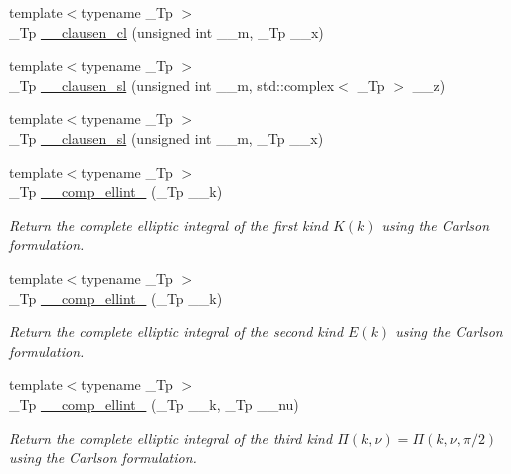 \begin{DoxyCompactItemize}
{\footnotesize template$<$typename \+\_\+\+Tp $>$ }\\\+\_\+\+Tp \hyperlink{namespacestd_1_1____detail_a523b5171a620d8816339c71994e67bb1}{\+\_\+\+\_\+clausen\+\_\+cl} (unsigned int \+\_\+\+\_\+m, \+\_\+\+Tp \+\_\+\+\_\+x)
\item 
{\footnotesize template$<$typename \+\_\+\+Tp $>$ }\\\+\_\+\+Tp \hyperlink{namespacestd_1_1____detail_ab7d250f236ef63ed8bd260881b73524d}{\+\_\+\+\_\+clausen\+\_\+sl} (unsigned int \+\_\+\+\_\+m, std\+::complex$<$ \+\_\+\+Tp $>$ \+\_\+\+\_\+z)
\item 
{\footnotesize template$<$typename \+\_\+\+Tp $>$ }\\\+\_\+\+Tp \hyperlink{namespacestd_1_1____detail_a554bb352d6397ea5991400eb3734165f}{\+\_\+\+\_\+clausen\+\_\+sl} (unsigned int \+\_\+\+\_\+m, \+\_\+\+Tp \+\_\+\+\_\+x)
\item 
{\footnotesize template$<$typename \+\_\+\+Tp $>$ }\\\+\_\+\+Tp \hyperlink{namespacestd_1_1____detail_a7b23bcf7e9f20b1e353a047126e13af1}{\+\_\+\+\_\+comp\+\_\+ellint\+\_} (\+\_\+\+Tp \+\_\+\+\_\+k)
\begin{DoxyCompactList}\small\item\em Return the complete elliptic integral of the first kind $ K(k) $ using the Carlson formulation. \end{DoxyCompactList}\item 
{\footnotesize template$<$typename \+\_\+\+Tp $>$ }\\\+\_\+\+Tp \hyperlink{namespacestd_1_1____detail_a4836f4db24abd037705100750f82d375}{\+\_\+\+\_\+comp\+\_\+ellint\+\_} (\+\_\+\+Tp \+\_\+\+\_\+k)
\begin{DoxyCompactList}\small\item\em Return the complete elliptic integral of the second kind $ E(k) $ using the Carlson formulation. \end{DoxyCompactList}\item 
{\footnotesize template$<$typename \+\_\+\+Tp $>$ }\\\+\_\+\+Tp \hyperlink{namespacestd_1_1____detail_a26b35b5d72366d30ac4644db8f2f8be4}{\+\_\+\+\_\+comp\+\_\+ellint\+\_} (\+\_\+\+Tp \+\_\+\+\_\+k, \+\_\+\+Tp \+\_\+\+\_\+nu)
\begin{DoxyCompactList}\small\item\em Return the complete elliptic integral of the third kind $ \Pi(k,\nu) = \Pi(k,\nu,\pi/2) $ using the Carlson formulation. \end{DoxyCompactList}\item 

\end{DoxyCompactItemize}
